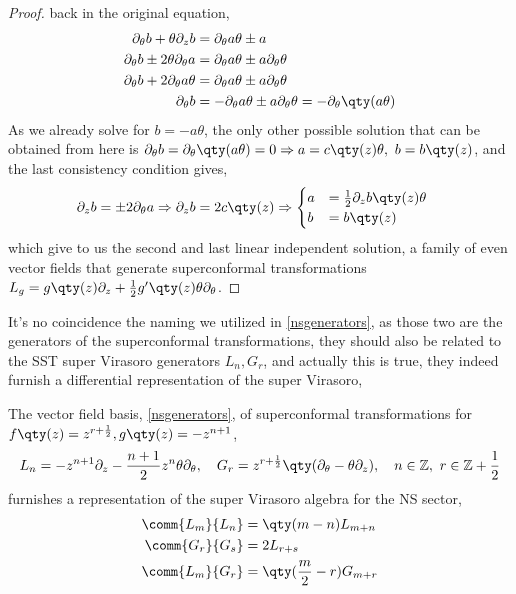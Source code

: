 \begin{proof}
back in the original equation,
\begin{align*}
    \partial_\theta b+\theta\partial_z b&=\partial_\theta a\theta\pm a\\
    \partial_\theta b\pm2\theta\partial_\theta a&=\partial_\theta a\theta\pm a\partial_\theta \theta\\
    \partial_\theta b+2\partial_\theta a\theta&=\partial_\theta a\theta\pm a\partial_\theta \theta\\
    \partial_\theta b&=-\partial_\theta a\theta\pm a\partial_\theta \theta=-\partial_\theta\qty(a\theta)
\end{align*}
As we already solve for $b=-a\theta$, the only other possible solution that can be obtained from here is 
$\partial_\theta b=\partial_\theta\qty(a\theta)=0\Rightarrow a=c\qty(z)\theta,\ b=b\qty(z)$, and the last consistency 
condition gives,
\begin{align*}
    \partial_z b&=\pm 2\partial_\theta a\Rightarrow\partial_z b= 2c\qty(z)\Rightarrow \begin{cases}a &= \frac12 \partial_z b\qty(z)\theta\\b &= b\qty(z)\end{cases} 
\end{align*}
which give to us the second and last linear independent solution, a family of even vector fields that generate 
superconformal transformations $L_g=g\qty(z)\partial_z+\frac12g'\qty(z)\theta\partial_\theta$.
\end{proof}
It's no coincidence the naming we utilized in \cref{nsgenerators}, as those two are the generators of the 
superconformal transformations, they should also be related to the SST super Virasoro generators $L_n,G_r$, 
and actually this is true, they indeed furnish a differential representation of the super Virasoro,
\begin{lemma}
    The vector field basis, \cref{nsgenerators}, of superconformal transformations for $f\qty(z)=z^{r+\frac12},g\qty(z)=-z^{n+1}$, 
    \[L_n=-z^{n+1}\partial_z-\frac{n+1}{2}z^n\theta\partial_\theta,\ \ \ G_r=z^{r+\frac12}\qty(\partial_\theta-\theta\partial_z),\ \ \ n\in\mathbb Z,\ r\in\mathbb Z+\frac12\]
    furnishes a representation of the super Virasoro algebra for the NS sector,
    \begin{align*}
        \comm{L_m}{L_n}&=\qty(m-n)L_{m+n}\\
        \comm{G_r}{G_s}&=2L_{r+s}\\
        \comm{L_m}{G_r}&=\qty(\frac m2-r)G_{m+r}
    \end{align*}
\end{lemma}
